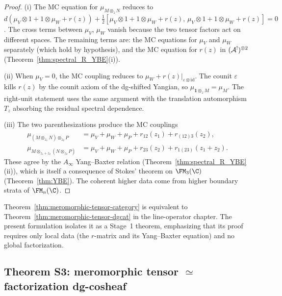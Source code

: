 \begin{proof}
(i) The MC equation for $\mu_{M \otimes_z N}$ reduces to
$d(\mu_V \otimes 1 + 1 \otimes \mu_W + r(z))
+ \tfrac{1}{2}[\mu_V \otimes 1 + 1 \otimes \mu_W + r(z),\,
\mu_V \otimes 1 + 1 \otimes \mu_W + r(z)] = 0$.
The cross terms between $\mu_V$, $\mu_W$ vanish because
the two tensor factors act on different spaces. The remaining
terms are: the MC equations for $\mu_V$ and $\mu_W$ separately
(which hold by hypothesis), and the MC equation for $r(z)$
in $(\mathcal{A}^!)^{\otimes 2}$ (Theorem~\ref{thm:spectral_R_YBE}(i)).

(ii) When $\mu_V = 0$, the MC coupling reduces to
$\mu_W + r(z)|_{\varepsilon \otimes \mathrm{id}}$. The counit
$\varepsilon$ kills $r(z)$ by the counit axiom of the
dg-shifted Yangian, so $\mu_{\mathbf{1} \otimes_z M} = \mu_M$.
The right-unit statement uses the same argument with the
translation automorphism $T_z$ absorbing the residual spectral
dependence.

(iii) The two parenthesizations produce the MC couplings
\begin{align*}
 \mu_{(M \otimes_{z_1} N) \otimes_{z_2} P}
 &= \mu_V + \mu_W + \mu_P
 + r_{12}(z_1) + r_{(12)3}(z_2), \\
 \mu_{M \otimes_{z_1+z_2} (N \otimes_{z_2} P)}
 &= \mu_V + \mu_W + \mu_P
 + r_{23}(z_2) + r_{1(23)}(z_1{+}z_2).
\end{align*}
These agree by the $A_\infty$ Yang--Baxter relation
(Theorem~\ref{thm:spectral_R_YBE}(ii)),
which is itself a consequence of Stokes' theorem on $\FM_3(\C)$
(Theorem~\ref{thm:YBE}). The coherent higher data come from
higher boundary strata of $\FM_n(\C)$.
\end{proof}

\begin{remark}
Theorem~\ref{thm:meromorphic-tensor-category} is equivalent to
Theorem~\ref{thm:meromorphic-tensor-dgcat} in the line-operator
chapter. The present formulation isolates it as a Stage~1 theorem,
emphasizing that its proof requires only local data (the $r$-matrix
and its Yang--Baxter equation) and no global factorization.
\end{remark}

\subsection{Theorem S3: meromorphic tensor $\simeq$
 factorization dg-cosheaf}
\label{subsec:meromorphic-factorization}

